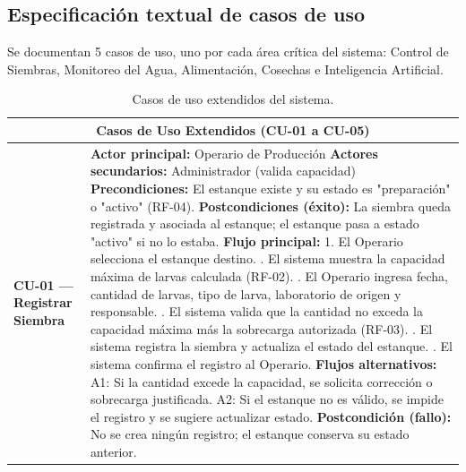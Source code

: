 \documentclass[11pt,a4paper]{article}
\begin{document}
\subsection{Especificación textual de casos de uso}
Se documentan 5 casos de uso, uno por cada área crítica del sistema: Control de Siembras, Monitoreo del Agua, Alimentación, Cosechas e Inteligencia Artificial.


\begin{longtable}{|p{3.5cm}|p{12cm}|}
\caption{Casos de uso extendidos del sistema.}
\label{tab:casos-uso-extendidos} \\
\hline

\multicolumn{2}{|c|}{\textbf{Casos de Uso Extendidos (CU-01 a CU-05)}} \\ \hline

\textbf{CU-01 — Registrar Siembra} &
\textbf{Actor principal:} Operario de Producción \newline
\textbf{Actores secundarios:} Administrador (valida capacidad) \newline
\textbf{Precondiciones:} El estanque existe y su estado es "preparación" o "activo" (RF-04). \newline
\textbf{Postcondiciones (éxito):} La siembra queda registrada y asociada al estanque; el estanque pasa a estado "activo" si no lo estaba. \newline
\textbf{Flujo principal:}
1. El Operario selecciona el estanque destino. \newline
2. El sistema muestra la capacidad máxima de larvas calculada (RF-02). \newline
3. El Operario ingresa fecha, cantidad de larvas, tipo de larva, laboratorio de origen y responsable. \newline
4. El sistema valida que la cantidad no exceda la capacidad máxima más la sobrecarga autorizada (RF-03). \newline
5. El sistema registra la siembra y actualiza el estado del estanque. \newline
6. El sistema confirma el registro al Operario. \newline
\textbf{Flujos alternativos:}
A1: Si la cantidad excede la capacidad, se solicita corrección o sobrecarga justificada. \newline
A2: Si el estanque no es válido, se impide el registro y se sugiere actualizar estado. \newline
\textbf{Postcondición (fallo):} No se crea ningún registro; el estanque conserva su estado anterior. \\ \hline


\end{longtable}
\end{document}
